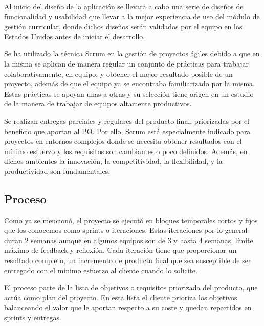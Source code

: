 Al inicio del diseño de la aplicación se llevará a cabo una serie de diseños de funcionalidad y usabilidad que llevar a la mejor experiencia de uso del módulo de gestión curricular, donde dichos diseños serán validados por el equipo en los Estados Unidos antes de iniciar el desarrollo.

Se ha utilizado la técnica Scrum en la gestión de proyectos ágiles debido a que en la misma se aplican de manera regular un conjunto de prácticas para trabajar colaborativamente, en equipo, y obtener el mejor resultado posible de un proyecto, además de que el equipo ya se encontraba familiarizado por la misma. Estas prácticas se apoyan unas a otras y su selección tiene origen en un estudio de la manera de trabajar de equipos altamente productivos.

Se realizan entregas parciales y regulares del producto final, priorizadas por el beneficio que aportan al PO. Por ello, Scrum está especialmente indicado para proyectos en entornos complejos donde se necesita obtener resultados con el mínimo esfuerzo y los requisitos son cambiantes o poco definidos. Además, en dichos ambientes la innovación, la competitividad, la flexibilidad, y la productividad son fundamentales.

\subsection{Proceso}
Como ya se mencionó, el proyecto se ejecutó en bloques temporales cortos y fijos que los conocemos como sprints o iteraciones. Estas iteraciones por lo general duran 2 semanas aunque en algunos equipos son de 3 y hasta 4 semanas, límite máximo de feedback y reflexión\citep{davis_agile_2015}. Cada iteración tiene que proporcionar un resultado completo, un incremento de producto final que sea susceptible de ser entregado con el mínimo esfuerzo al cliente cuando lo solicite.

El proceso parte de la lista de objetivos o requisitos priorizada del producto, que actúa como plan del proyecto. En esta lista el cliente prioriza los objetivos balanceando el valor que le aportan respecto a su coste y quedan repartidos en sprints y entregas.


